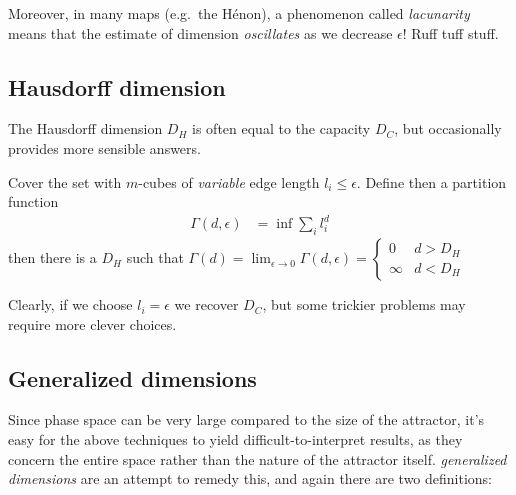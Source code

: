 \documentclass[12pt]{article}
\begin{document}
Moreover, in many maps (e.g.\ the H\'enon), a phenomenon called
\emph{lacunarity} means that the estimate of dimension \emph{oscillates} as we
decrease $\epsilon$! Ruff tuff stuff.

\subsection{Hausdorff dimension}

The Hausdorff dimension $D_H$ is often equal to the capacity $D_C$, but
occasionally provides more sensible answers.

Cover the set with $m$-cubes of \emph{variable} edge length $l_i \leq \epsilon$.
Define then a partition function
\begin{align}
    \Gamma(d, \epsilon) &= \inf \sum\limits_{i}^{}l_i^d
\end{align}
then there is a  $D_H$ such that
$\Gamma(d) = \lim_{\epsilon \to 0} \Gamma(d,\epsilon) =
\begin{cases}
    0 & d > D_H\\
    \infty & d < D_H
\end{cases}$

Clearly, if we choose $l_i = \epsilon$ we recover $D_C$, but some trickier
problems may require more clever choices.

\subsection{Generalized dimensions}

Since phase space can be very large compared to the size of the attractor, it's
easy for the above techniques to yield difficult-to-interpret results, as they
concern the entire space rather than the nature of the attractor itself.
\emph{generalized dimensions} are an attempt to remedy this, and again there are
two definitions:
\end{document}
